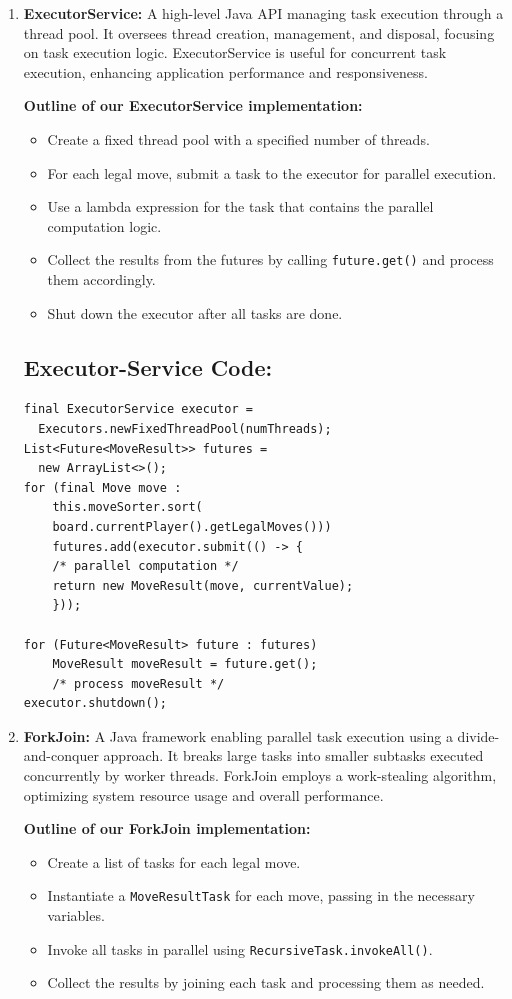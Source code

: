\documentclass[conference, 11pt]{IEEEtran}
\begin{document}
\begin{enumerate}
\item \textbf{ExecutorService:} A high-level Java API managing task execution through a thread pool. It oversees thread creation, management, and disposal, focusing on task execution logic. ExecutorService is useful for concurrent task execution, enhancing application performance and responsiveness.

\textbf{Outline of our ExecutorService implementation:}
\begin{itemize}
\item Create a fixed thread pool with a specified number of threads.
\item For each legal move, submit a task to the executor for parallel execution.
\item Use a lambda expression for the task that contains the parallel computation logic.
\item Collect the results from the futures by calling \texttt{future.get()} and process them accordingly.
\item Shut down the executor after all tasks are done.
\end{itemize}

\subsection{Executor-Service Code:}
\lstset{basicstyle=\small}
\begin{lstlisting}
final ExecutorService executor =
  Executors.newFixedThreadPool(numThreads);
List<Future<MoveResult>> futures =
  new ArrayList<>();
for (final Move move :
    this.moveSorter.sort(
    board.currentPlayer().getLegalMoves())) 
    futures.add(executor.submit(() -> {
	/* parallel computation */
    return new MoveResult(move, currentValue);
    }));

for (Future<MoveResult> future : futures) 
    MoveResult moveResult = future.get();
    /* process moveResult */
executor.shutdown();
\end{lstlisting}

\item \textbf{ForkJoin:} A Java framework enabling parallel task execution using a divide-and-conquer approach. It breaks large tasks into smaller subtasks executed concurrently by worker threads. ForkJoin employs a work-stealing algorithm, optimizing system resource usage and overall performance.

\textbf{Outline of our ForkJoin implementation:}
\begin{itemize}
\item Create a list of tasks for each legal move.
\item Instantiate a \texttt{MoveResultTask} for each move, passing in the necessary variables.
\item Invoke all tasks in parallel using \texttt{RecursiveTask.invokeAll()}.
\item Collect the results by joining each task and processing them as needed. \newline \newline
\end{itemize} 


\end{enumerate}
\end{document}
